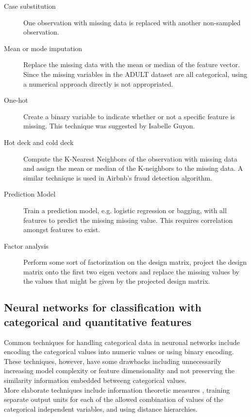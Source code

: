 \documentclass[12pt]{article}
\begin{document}
\begin{description}
\item[Case substitution] One observation with missing data is replaced with
another non-sampled observation.
\item[Mean or mode imputation] Replace the missing data with the mean or median of
    the feature vector. Since the missing variables in the ADULT dataset are
    all categorical, using a numerical approach directly is not appropriated.
\item[One-hot] Create a binary variable to indicate whether or not a specific
    feature is missing. This technique was suggested by Isabelle Guyon.
\item[Hot deck and cold deck] Compute the K-Nearest Neighbors of the
    observation with missing data and assign the mean or median of the K-neighbors
    to the missing data. A similar technique is used in Airbnb's fraud detection
    algorithm.
\item[Prediction Model] Train a prediction model, e.g. logistic regression or  
    bagging, with all features to predict the missing missing value. This
    requires correlation amongst features to exist.
\item[Factor analysis] Perform some sort of factorization on the design
    matrix, project the design matrix onto the first two eigen vectors and
    replace the missing values by the values that might be given by the
    projected design matrix.
\end{description}

\subsection{Neural networks for classification with categorical and
quantitative features}  Common techniques for handling categorical data in
neuronal networks include encoding the categorical values into numeric values
or using binary encoding. These techniques, however, have some drawbacks
including unnecessarily increasing model complexity or feature dimensionality
and not preserving the similarity information embedded betweeng categorical
values\citep{hsu2006generalizing}.\\

More elaborate techniques include information theoretic measures
\citep{wang2008categorical}, training separate output units for
each of the allowed combination of values of the categorical independent
variables\citep{brouwer2002feed}, and using distance
hierarchies\citep{hsu2006generalizing}.

\pagebreak





\itemize
\end{document}
